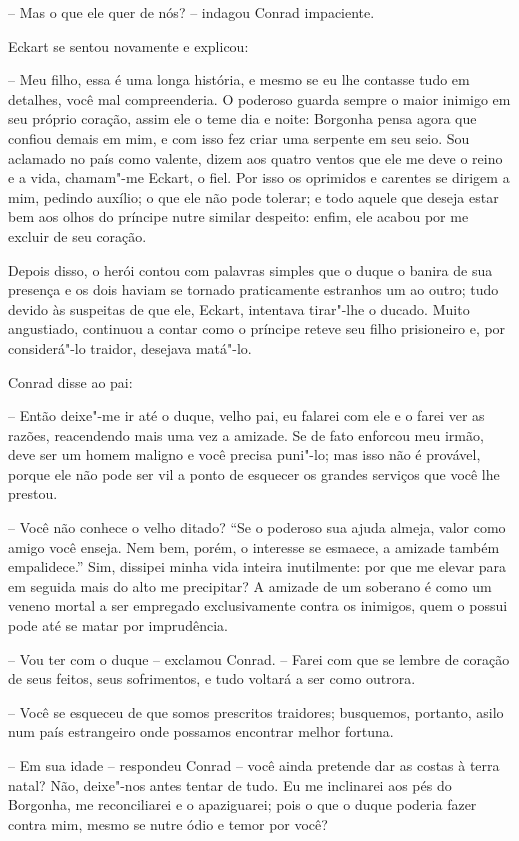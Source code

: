  -- Mas o que ele quer de nós? -- indagou Conrad impaciente.

 Eckart se sentou novamente e explicou:

 -- Meu filho, essa é uma longa história, e mesmo se eu lhe contasse tudo
em detalhes, você mal compreenderia. O poderoso guarda sempre o maior
inimigo em seu próprio coração, assim ele o teme dia e noite: Borgonha
pensa agora que confiou demais em mim, e com isso fez criar uma
serpente em seu seio. Sou aclamado no país como valente, dizem aos
quatro ventos que ele me deve o reino e a vida, chamam"-me Eckart, o
fiel. Por isso os oprimidos e carentes se dirigem a mim, pedindo
auxílio; o que ele não pode tolerar; e todo aquele que deseja estar bem
aos olhos do príncipe nutre \mbox{similar} despeito: enfim, ele acabou por me
excluir de seu coração.

 Depois disso, o herói contou com palavras simples que o duque o banira
de sua presença e os dois haviam se tornado praticamente estranhos um
ao outro; tudo devido às suspeitas de que ele, Eckart, intentava
tirar"-lhe o ducado. Muito angustiado, continuou a contar como o
príncipe reteve seu filho prisioneiro e, por considerá"-lo traidor,
desejava matá"-lo.

 Conrad disse ao pai:

-- Então deixe"-me ir até o duque, velho pai, eu falarei com ele e o
farei ver as razões, reacendendo mais uma vez a amizade. Se de fato
enforcou meu irmão, deve ser um homem maligno e você precisa puni"-lo;
mas isso não é provável, porque ele não pode ser vil a ponto de
esquecer os grandes serviços que você lhe prestou.

-- Você não conhece o velho ditado? ``Se o poderoso sua ajuda almeja,
valor como amigo você enseja. Nem bem, porém, o interesse se esmaece,
a amizade também empalidece.'' Sim, dissipei minha vida inteira inutilmente: 
por que me elevar para em seguida mais do alto me precipitar? A amizade 
de um soberano é como um veneno mortal a ser empregado exclusivamente 
contra os inimigos, quem o possui pode até se matar por imprudência.

-- Vou ter com o duque -- exclamou Conrad. -- Farei com que se lembre de
coração de seus feitos, seus sofrimentos, e tudo voltará a ser como
outrora.
 
-- Você se esqueceu de que somos prescritos traidores; busquemos, portanto,
asilo num país estrangeiro onde possamos encontrar melhor fortuna.

-- Em sua idade -- respondeu Conrad -- você ainda pretende dar as costas à
terra natal? Não, deixe"-nos antes tentar de tudo. Eu me inclinarei aos
pés do Borgonha, me reconciliarei e o apaziguarei; pois o que o duque
poderia fazer contra mim, mesmo se nutre ódio e temor por você?


